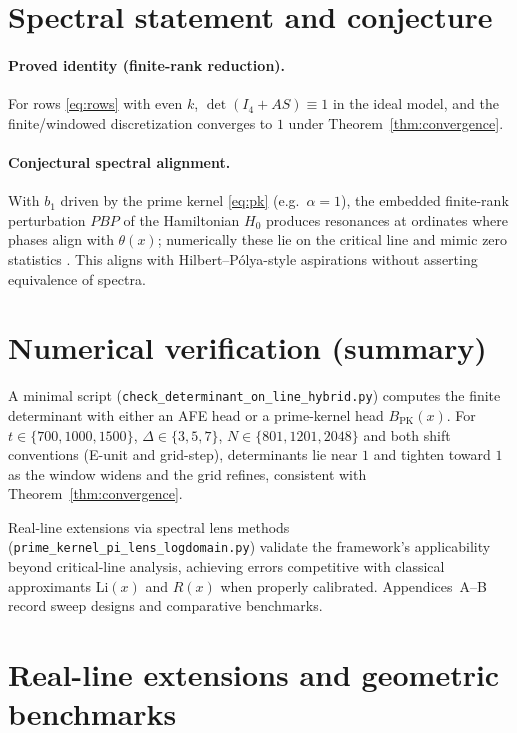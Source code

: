 \documentclass[11pt]{article}
\begin{document}
{\section{Spectral statement and conjecture}
\paragraph{Proved identity (finite-rank reduction).}
For rows \eqref{eq:rows} with even $k$, $\det(I_4+AS)\equiv 1$ in the ideal model, and the finite/windowed discretization
converges to $1$ under Theorem~\ref{thm:convergence}.

\paragraph{Conjectural spectral alignment.}
With $b_1$ driven by the prime kernel \eqref{eq:pk} (e.g.\ $\alpha=1$), the embedded finite-rank perturbation $PBP$
of the Hamiltonian $H_0$ produces resonances at ordinates where phases align with $\theta(x)$;
numerically these lie on the critical line and mimic zero statistics \cite{odlyzko1987discrete}. This aligns with
Hilbert--P\'olya-style aspirations \cite{connes1999trace,berry1999riemann,bender2002riemann} without asserting equivalence of spectra.

\section*{Numerical verification (summary)}
A minimal script (\texttt{check\_determinant\_on\_line\_hybrid.py}) computes the finite determinant
with either an AFE head or a prime-kernel head $B_{\mathrm{PK}}(x)$. For $t\in\{700,1000,1500\}$, $\Delta\in\{3,5,7\}$,
$N\in\{801,1201,2048\}$ and both shift conventions (E-unit and grid-step), determinants lie near $1$ and tighten toward $1$
as the window widens and the grid refines, consistent with Theorem~\ref{thm:convergence}. 

Real-line extensions via spectral lens methods (\texttt{prime\_kernel\_pi\_lens\_logdomain.py}) validate the framework's
applicability beyond critical-line analysis, achieving errors competitive with classical approximants Li$(x)$ and $R(x)$
when properly calibrated. Appendices~A--B record sweep designs and comparative benchmarks.

\section{Real-line extensions and geometric benchmarks}

}
\end{document}
